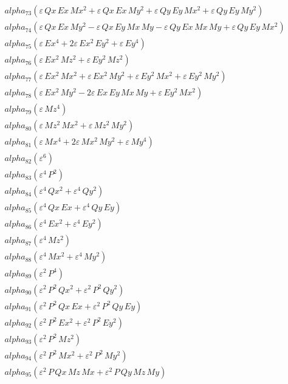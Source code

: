 \documentclass{article}
\begin{document}
\begin{align*}
  &\quad alpha_{73} \left(ε\,Qx\,Ex\,Mx^{2} + ε\,Qx\,Ex\,My^{2} + ε\,Qy\,Ey\,Mx^{2} + ε\,Qy\,Ey\,My^{2}\right) \\
  &\quad alpha_{74} \left(ε\,Qx\,Ex\,My^{2} -ε\,Qx\,Ey\,Mx\,My -ε\,Qy\,Ex\,Mx\,My + ε\,Qy\,Ey\,Mx^{2}\right) \\
  &\quad alpha_{75} \left(ε\,Ex^{4} + 2ε\,Ex^{2}\,Ey^{2} + ε\,Ey^{4}\right) \\
  &\quad alpha_{76} \left(ε\,Ex^{2}\,Mz^{2} + ε\,Ey^{2}\,Mz^{2}\right) \\
  &\quad alpha_{77} \left(ε\,Ex^{2}\,Mx^{2} + ε\,Ex^{2}\,My^{2} + ε\,Ey^{2}\,Mx^{2} + ε\,Ey^{2}\,My^{2}\right) \\
  &\quad alpha_{78} \left(ε\,Ex^{2}\,My^{2} - 2ε\,Ex\,Ey\,Mx\,My + ε\,Ey^{2}\,Mx^{2}\right) \\
  &\quad alpha_{79} \left(ε\,Mz^{4}\right) \\
  &\quad alpha_{80} \left(ε\,Mz^{2}\,Mx^{2} + ε\,Mz^{2}\,My^{2}\right) \\
  &\quad alpha_{81} \left(ε\,Mx^{4} + 2ε\,Mx^{2}\,My^{2} + ε\,My^{4}\right) \\
  &\quad alpha_{82} \left(ε^{6}\right) \\
  &\quad alpha_{83} \left(ε^{4}\,P^{2}\right) \\
  &\quad alpha_{84} \left(ε^{4}\,Qx^{2} + ε^{4}\,Qy^{2}\right) \\
  &\quad alpha_{85} \left(ε^{4}\,Qx\,Ex + ε^{4}\,Qy\,Ey\right) \\
  &\quad alpha_{86} \left(ε^{4}\,Ex^{2} + ε^{4}\,Ey^{2}\right) \\
  &\quad alpha_{87} \left(ε^{4}\,Mz^{2}\right) \\
  &\quad alpha_{88} \left(ε^{4}\,Mx^{2} + ε^{4}\,My^{2}\right) \\
  &\quad alpha_{89} \left(ε^{2}\,P^{4}\right) \\
  &\quad alpha_{90} \left(ε^{2}\,P^{2}\,Qx^{2} + ε^{2}\,P^{2}\,Qy^{2}\right) \\
  &\quad alpha_{91} \left(ε^{2}\,P^{2}\,Qx\,Ex + ε^{2}\,P^{2}\,Qy\,Ey\right) \\
  &\quad alpha_{92} \left(ε^{2}\,P^{2}\,Ex^{2} + ε^{2}\,P^{2}\,Ey^{2}\right) \\
  &\quad alpha_{93} \left(ε^{2}\,P^{2}\,Mz^{2}\right) \\
  &\quad alpha_{94} \left(ε^{2}\,P^{2}\,Mx^{2} + ε^{2}\,P^{2}\,My^{2}\right) \\
  &\quad alpha_{95} \left(ε^{2}\,P\,Qx\,Mz\,Mx + ε^{2}\,P\,Qy\,Mz\,My\right) \\

\end{align*}
\end{document}

